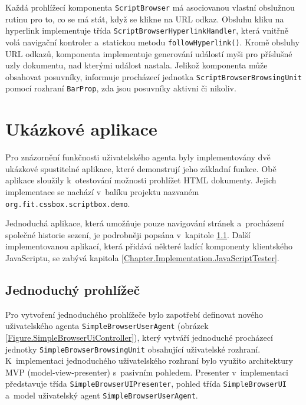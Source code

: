 Každá prohlížecí komponenta \texttt{ScriptBrowser} má asociovanou vlastní obslužnou rutinu pro to, co se má stát, když se klikne na URL odkaz. Obsluhu kliku na hyperlink implementuje třída \texttt{ScriptBrowserHyperlinkHandler}, která vnitřně volá navigační kontroler a~statickou metodu \texttt{followHyperlink()}. Kromě obsluhy URL odkazů, komponenta implementuje generování událostí myši pro příslušné uzly dokumentu, nad kterými událost nastala. Jelikož komponenta může obsahovat posuvníky, informuje procházecí jednotka \texttt{ScriptBrowserBrowsingUnit} pomocí rozhraní \texttt{BarProp}, zda jsou posuvníky aktivni či nikoliv.

\section{Ukázkové aplikace}
\label{Chapter.Implementation.DemoApplications}

Pro znázornění funkčnosti uživatelského agenta byly implementovány dvě ukázkové spustitelné aplikace, které demonstrují jeho základní funkce. Obě aplikace sloužily k~otestování možnosti prohlížet HTML dokumenty. Jejich implementace se nachází v~balíku projektu nazvaném \texttt{org.fit.cssbox.scriptbox.demo}.

Jednoduchá aplikace, která umožňuje pouze navigování stránek a~procházení společné historie sezení, je podrobněji popsána v~kapitole \ref{Chapter.Implementation.SimpleBrowser}. Další implementovanou aplikací, která přidává některé ladící komponenty klientského JavaScriptu, se zabývá kapitola \ref{Chapter.Implementation.JavaScriptTester}.  

\vspace{-0.5em}

\subsection{Jednoduchý prohlížeč}
\label{Chapter.Implementation.SimpleBrowser}

Pro vytvoření jednoduchého prohlížeče bylo zapotřebí definovat nového uživatelského agenta \texttt{SimpleBrowserUserAgent} (obrázek \ref{Figure.SimpleBrowserUiController}), který vytváří jednoduché procházecí jednotky \texttt{SimpleBrowserBrowsingUnit} obsahující uživatelské rozhraní. K~implementaci jednoduchého uživatelského rozhraní bylo využito architektury MVP (model-view-presenter) s~pasivním pohledem. Presenter v~implementaci představuje třída \texttt{SimpleBrowserUIPresenter}, pohled třída \texttt{SimpleBrowserUI} a~model uživatelský agent \texttt{SimpleBrowserUserAgent}.

